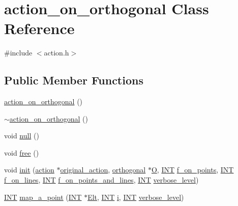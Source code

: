 \hypertarget{classaction__on__orthogonal}{}\section{action\+\_\+on\+\_\+orthogonal Class Reference}
\label{classaction__on__orthogonal}


{\ttfamily \#include $<$action.\+h$>$}

\subsection*{Public Member Functions}
\begin{DoxyCompactItemize}
\item 
\mbox{\hyperlink{classaction__on__orthogonal_ac70cbb19a66aae80abc5718840bdfb9b}{action\+\_\+on\+\_\+orthogonal}} ()
\item 
\mbox{\hyperlink{classaction__on__orthogonal_ae9176d81d0c10aae9bfa88e376cd65ea}{$\sim$action\+\_\+on\+\_\+orthogonal}} ()
\item 
void \mbox{\hyperlink{classaction__on__orthogonal_a50e34fbf0f74c9fb81867ae2d36d5f75}{null}} ()
\item 
void \mbox{\hyperlink{classaction__on__orthogonal_a44eaca6df9aa227c3f8263e08403aabf}{free}} ()
\item 
void \mbox{\hyperlink{classaction__on__orthogonal_a5d66e1b51f4c836e358401dce9ed4ee6}{init}} (\mbox{\hyperlink{classaction}{action}} $\ast$\mbox{\hyperlink{classaction__on__orthogonal_a4bc29d53b412140c499cba73c17e2448}{original\+\_\+action}}, \mbox{\hyperlink{classorthogonal}{orthogonal}} $\ast$\mbox{\hyperlink{classaction__on__orthogonal_af9a8e20f1e4deefc50fc25889b7fd489}{O}}, \mbox{\hyperlink{galois_8h_a09fddde158a3a20bd2dcadb609de11dc}{I\+NT}} \mbox{\hyperlink{classaction__on__orthogonal_a90a0153916e9b840c07965f2f0ef11f8}{f\+\_\+on\+\_\+points}}, \mbox{\hyperlink{galois_8h_a09fddde158a3a20bd2dcadb609de11dc}{I\+NT}} \mbox{\hyperlink{classaction__on__orthogonal_a8d45890a2278cfc2deb0ca4027ba77df}{f\+\_\+on\+\_\+lines}}, \mbox{\hyperlink{galois_8h_a09fddde158a3a20bd2dcadb609de11dc}{I\+NT}} \mbox{\hyperlink{classaction__on__orthogonal_a712821e90e81147ca2b36feca041dd8c}{f\+\_\+on\+\_\+points\+\_\+and\+\_\+lines}}, \mbox{\hyperlink{galois_8h_a09fddde158a3a20bd2dcadb609de11dc}{I\+NT}} \mbox{\hyperlink{simeon_8_c_a818073fbcc2f439e7c56952f67386122}{verbose\+\_\+level}})
\item 
\mbox{\hyperlink{galois_8h_a09fddde158a3a20bd2dcadb609de11dc}{I\+NT}} \mbox{\hyperlink{classaction__on__orthogonal_a99224de62ef02d140676a31ac663a63b}{map\+\_\+a\+\_\+point}} (\mbox{\hyperlink{galois_8h_a09fddde158a3a20bd2dcadb609de11dc}{I\+NT}} $\ast$\mbox{\hyperlink{simeon_8_c_aec1406935bdb1fee3561fcb840964100}{Elt}}, \mbox{\hyperlink{galois_8h_a09fddde158a3a20bd2dcadb609de11dc}{I\+NT}} \mbox{\hyperlink{alphabet2_8_c_acb559820d9ca11295b4500f179ef6392}{i}}, \mbox{\hyperlink{galois_8h_a09fddde158a3a20bd2dcadb609de11dc}{I\+NT}} \mbox{\hyperlink{simeon_8_c_a818073fbcc2f439e7c56952f67386122}{verbose\+\_\+level}})

\end{DoxyCompactItemize}
